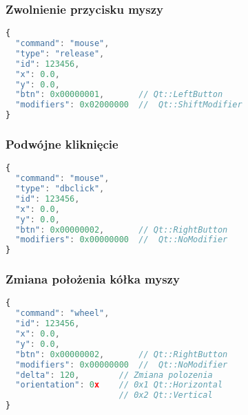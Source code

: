 \subsubsection{Zwolnienie przycisku myszy}
\begin{lstlisting}[language=JavaScript,numbers=none]
{
  "command": "mouse",
  "type": "release",
  "id": 123456,
  "x": 0.0,
  "y": 0.0,
  "btn": 0x00000001,       // Qt::LeftButton
  "modifiers": 0x02000000  //  Qt::ShiftModifier
}
\end{lstlisting}

\subsubsection{Podwójne kliknięcie}
\begin{lstlisting}[language=JavaScript,numbers=none]
{
  "command": "mouse",
  "type": "dbclick",
  "id": 123456,
  "x": 0.0,
  "y": 0.0,
  "btn": 0x00000002,       // Qt::RightButton
  "modifiers": 0x00000000  //  Qt::NoModifier
}
\end{lstlisting}

\subsubsection{Zmiana położenia kółka myszy}
\begin{lstlisting}[language=JavaScript,numbers=none]
{
  "command": "wheel",
  "id": 123456,
  "x": 0.0,
  "y": 0.0,
  "btn": 0x00000002,       // Qt::RightButton
  "modifiers": 0x00000000  //  Qt::NoModifier
  "delta": 120,        // Zmiana polozenia
  "orientation": 0x    // 0x1 Qt::Horizontal
                       // 0x2 Qt::Vertical
}
\end{lstlisting} 